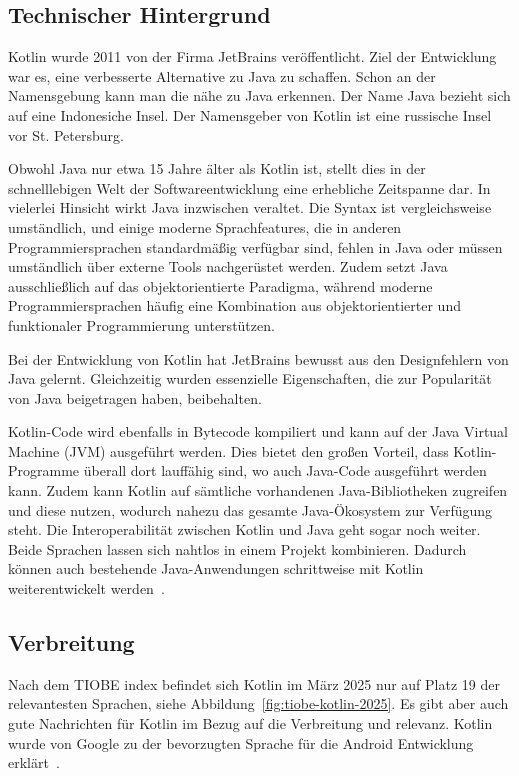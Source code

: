 \documentclass[11pt]{article}
\begin{document}
    \subsection{Technischer Hintergrund}
    Kotlin wurde 2011 von der Firma JetBrains veröffentlicht.
    Ziel der Entwicklung war es, eine verbesserte Alternative zu Java zu schaffen.
    Schon an der Namensgebung kann man die nähe zu Java erkennen.
    Der Name Java bezieht sich auf eine Indonesiche Insel.
    Der Namensgeber von Kotlin ist eine russische Insel vor St. Petersburg.

    Obwohl Java nur etwa 15 Jahre älter als Kotlin ist, stellt dies in der schnelllebigen Welt der Softwareentwicklung eine erhebliche Zeitspanne dar.
    In vielerlei Hinsicht wirkt Java inzwischen veraltet.
    Die Syntax ist vergleichsweise umständlich, und einige moderne Sprachfeatures, die in anderen Programmiersprachen standardmäßig verfügbar sind, fehlen in Java oder
    müssen umständlich über externe Tools nachgerüstet werden.
    Zudem setzt Java ausschließlich auf das objektorientierte Paradigma,
    während moderne Programmiersprachen häufig eine Kombination aus objektorientierter und funktionaler Programmierung unterstützen.

    Bei der Entwicklung von Kotlin hat JetBrains bewusst aus den Designfehlern von Java gelernt.
    Gleichzeitig wurden essenzielle Eigenschaften, die zur Popularität von Java beigetragen haben, beibehalten.

    Kotlin-Code wird ebenfalls in Bytecode kompiliert und kann auf der Java Virtual Machine (JVM) ausgeführt werden.
    Dies bietet den großen Vorteil, dass Kotlin-Programme überall dort lauffähig sind, wo auch Java-Code ausgeführt werden kann.
    Zudem kann Kotlin auf sämtliche vorhandenen Java-Bibliotheken zugreifen und diese nutzen, wodurch nahezu das gesamte Java-Ökosystem zur Verfügung steht.
    Die Interoperabilität zwischen Kotlin und Java geht sogar noch weiter.
    Beide Sprachen lassen sich nahtlos in einem Projekt kombinieren.
    Dadurch können auch bestehende Java-Anwendungen schrittweise mit Kotlin weiterentwickelt werden~\cite[19-20]{kotlin-handbuch}.

    \subsection{Verbreitung}
    Nach dem TIOBE index befindet sich Kotlin im März 2025 nur auf Platz 19 der relevantesten Sprachen, siehe Abbildung~\ref{fig:tiobe-kotlin-2025}.
    Es gibt aber auch gute Nachrichten für Kotlin im Bezug auf die Verbreitung und relevanz.
    Kotlin wurde von Google zu der bevorzugten Sprache für die Android Entwicklung erklärt~\cite{tn3-google}.
\end{document}
